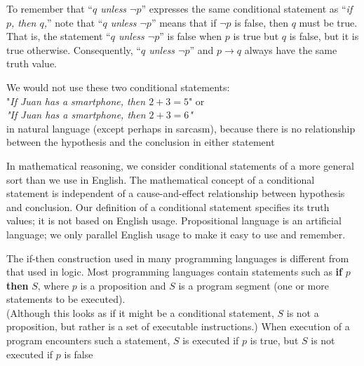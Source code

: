 \begin{tcolorbox}[colback=white, colframe=gray!60, title=Remark 8]
To remember that “\textit{$q$ unless $\neg p$}” expresses the same conditional statement as “\textit{if $p$, then $q$,}” note that “\textit{$q$ unless $\neg p$}” means that if $\neg p$ is false, then $q$ must be true. That is, the statement
“\textit{$q$ unless $\neg p$}” is false when $p$ is true but $q$ is false, but it is true otherwise. Consequently,
“\textit{$q$ unless $\neg p$}” and $p \rightarrow q$ always have the same truth value.
\end{tcolorbox}
\begin{tcolorbox}[colback=white, colframe=gray!60, title=Remark 9]
We would not use
these two conditional statements: \\ "\textit{If Juan has a smartphone, then $2 + 3 = 5$}" or \\ \textit{"If Juan has a smartphone, then $2 + 3 = 6$"} \\ in natural language (except perhaps in sarcasm), because
there is no relationship between the hypothesis and the conclusion in either statement
\end{tcolorbox}
\begin{tcolorbox}[colback=white, colframe=gray!60, title=Remark 10]
In mathematical reasoning, we consider conditional statements of a more general sort than we use in English. The mathematical concept of a conditional statement is independent of a cause-and-effect
relationship between hypothesis and conclusion. Our definition of a conditional statement
specifies its truth values; it is not based on English usage. Propositional language is an artificial
language; we only parallel English usage to make it easy to use and remember.
\end{tcolorbox}
\begin{tcolorbox}[colback=white, colframe=gray!60, title=Remark 11]
The if-then construction used in many programming languages is different from that
used in logic. Most programming languages contain statements such as \textbf{if} $p$ \textbf{then} $S$, where
$p$ is a proposition and $S$ is a program segment (one or more statements to be executed). \\
(Although this looks as if it might be a conditional statement, $S$ is not a proposition, but
rather is a set of executable instructions.) When execution of a program encounters such
a statement, $S$ is executed if $p$ is true, but $S$ is not executed if $p$ is false
\end{tcolorbox}

